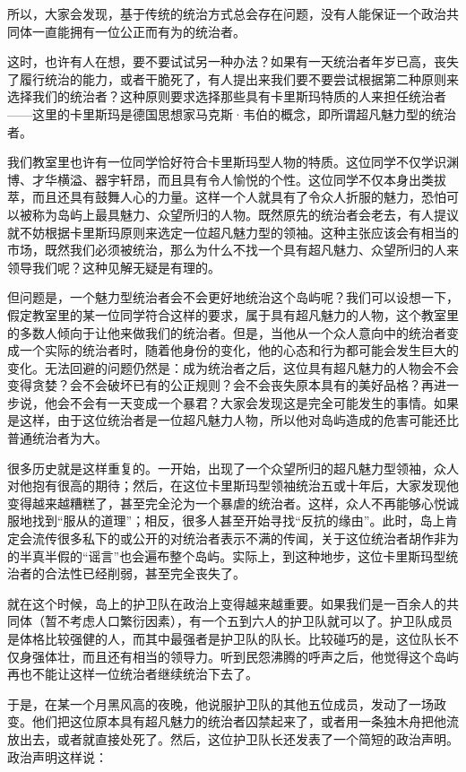 所以，大家会发现，基于传统的统治方式总会存在问题，没有人能保证一个政治共同体一直能拥有一位公正而有为的统治者。

这时，也许有人在想，要不要试试另一种办法？如果有一天统治者年岁已高，丧失了履行统治的能力，或者干脆死了，有人提出来我们要不要尝试根据第二种原则来选择我们的统治者？这种原则要求选择那些具有卡里斯玛特质的人来担任统治者——这里的卡里斯玛是德国思想家马克斯·韦伯的概念，即所谓超凡魅力型的统治者。

我们教室里也许有一位同学恰好符合卡里斯玛型人物的特质。这位同学不仅学识渊博、才华横溢、器宇轩昂，而且具有令人愉悦的个性。这位同学不仅本身出类拔萃，而且还具有鼓舞人心的力量。这样一个人就具有了令众人折服的魅力，恐怕可以被称为岛屿上最具魅力、众望所归的人物。既然原先的统治者会老去，有人提议就不妨根据卡里斯玛原则来选定一位超凡魅力型的领袖。这种主张应该会有相当的市场，既然我们必须被统治，那么为什么不找一个具有超凡魅力、众望所归的人来领导我们呢？这种见解无疑是有理的。

但问题是，一个魅力型统治者会不会更好地统治这个岛屿呢？我们可以设想一下，假定教室里的某一位同学符合这样的要求，属于具有超凡魅力的人物，这个教室里的多数人倾向于让他来做我们的统治者。但是，当他从一个众人意向中的统治者变成一个实际的统治者时，随着他身份的变化，他的心态和行为都可能会发生巨大的变化。无法回避的问题仍然是：成为统治者之后，这位具有超凡魅力的人物会不会变得贪婪？会不会破坏已有的公正规则？会不会丧失原本具有的美好品格？再进一步说，他会不会有一天变成一个暴君？大家会发现这是完全可能发生的事情。如果是这样，由于这位统治者是一位超凡魅力人物，所以他对岛屿造成的危害可能还比普通统治者为大。

很多历史就是这样重复的。一开始，出现了一个众望所归的超凡魅力型领袖，众人对他抱有很高的期待；然后，在这位卡里斯玛型领袖统治五或十年后，大家发现他变得越来越糟糕了，甚至完全沦为一个暴虐的统治者。这样，众人不再能够心悦诚服地找到“服从的道理”；相反，很多人甚至开始寻找“反抗的缘由”。此时，岛上肯定会流传很多私下的或公开的对统治者表示不满的传闻，关于这位统治者胡作非为的半真半假的“谣言”也会遍布整个岛屿。实际上，到这种地步，这位卡里斯玛型统治者的合法性已经削弱，甚至完全丧失了。

就在这个时候，岛上的护卫队在政治上变得越来越重要。如果我们是一百余人的共同体（暂不考虑人口繁衍因素），有一个五到六人的护卫队就可以了。护卫队成员是体格比较强健的人，而其中最强者是护卫队的队长。比较碰巧的是，这位队长不仅身强体壮，而且还有相当的领导力。听到民怨沸腾的呼声之后，他觉得这个岛屿再也不能让这样一位统治者继续统治下去了。

于是，在某一个月黑风高的夜晚，他说服护卫队的其他五位成员，发动了一场政变。他们把这位原本具有超凡魅力的统治者囚禁起来了，或者用一条独木舟把他流放出去，或者就直接处死了。然后，这位护卫队长还发表了一个简短的政治声明。政治声明这样说：

